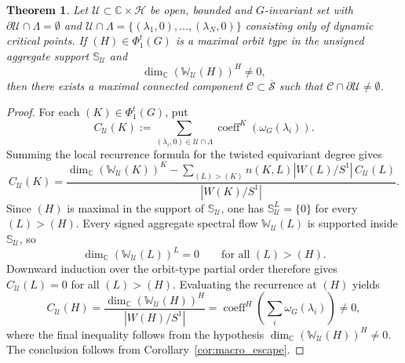 \documentclass[10pt,a4paper]{amsart}
\newtheorem{theorem}{Theorem}
\def\bc{{\mathbb{C}}}
\begin{document}
\begin{theorem}\label{thm:macroscopic_escape}
Let $\mathcal U\subset\bc\times\mathscr H$ be open, bounded and
$G$-invariant set with $\partial\mathcal U\cap\Lambda=\emptyset$ and
$\mathcal U\cap\Lambda=\{(\lambda_1,0),\ldots,(\lambda_N,0)\}$ consisting only of dynamic critical points. If $(H)\in\Phi_1^t(G)$ is a maximal orbit type in the unsigned aggregate support $\mathbb S_{\mathcal U}$ and
\[
\dim_\bc
\left(
\mathbb W_{\mathcal U}(H)
\right)^H
\neq 0,
\]
then there exists a maximal connected component $\mathscr C\subset\overline{\mathscr S}$ such that $\mathscr C\cap\partial\mathcal U\neq\emptyset$.
\end{theorem}

\begin{proof}
For each $(K)\in\Phi_1^t(G)$, put
\[
C_{\mathcal U}(K)
:=
\sum_{(\lambda_i,0)\in\mathcal U\cap\Lambda}
\operatorname{coeff}^K(\omega_G(\lambda_i)).
\]
Summing the local recurrence formula for the twisted equivariant degree gives
\[
C_{\mathcal U}(K)
=
\frac{
\dim_\bc \left(\mathbb W_{\mathcal U}(K) \right)^K - \sum_{(L)>(K)}
n(K,L)|W(L)/S^1|\,C_{\mathcal U}(L)}
{|W(K)/S^1|}.
\]
Since $(H)$ is maximal in the support of $\mathbb S_{\mathcal U}$, one has $\mathbb S_{\mathcal U}^L=\{0\}$ for every $(L)>(H)$. Every signed aggregate spectral flow $\mathbb W_{\mathcal U}(L)$ is supported inside $\mathbb S_{\mathcal U}$, so
\[
\dim_\bc \left( \mathbb W_{\mathcal U}(L)
\right)^L =0
\qquad \text{for all } (L)>(H).
\]
Downward induction over the orbit-type partial order therefore gives $C_{\mathcal U}(L)=0$ for all $(L)>(H)$. Evaluating the recurrence at $(H)$ yields
\[
C_{\mathcal U}(H)
= \frac{ \dim_\bc \left(\mathbb W_{\mathcal U}(H) \right)^H} {|W(H)/S^1|}
= \operatorname{coeff}^H \left( \sum_i\omega_G(\lambda_i) \right) \neq 0,
\]
where the final inequality follows from the hypothesis $\dim_\bc(\mathbb W_{\mathcal U}(H))^H\neq0$. The conclusion follows from Corollary~\ref{cor:macro_escape}.
\end{proof}
\end{document}
